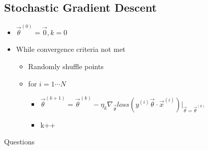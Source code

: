 \documentclass[10pt, oneside]{article}
\begin{document}
\subsection{Stochastic Gradient Descent}
\begin{itemize}
    \item $\vec \theta^{(0)} = \vec 0, k=0$
    \item While convergence criteria not met
    \begin{itemize}
        \item Randomly shuffle points
        \item for $i=1\cdots N$
        \begin{itemize}
            \item $\vec \theta^{(k+1)} = \vec \theta ^{(k)} - \eta_k \nabla_{\vec \theta} loss(y^{(i)} \vec \theta \cdot \vec x^{(i)})|_{\vec \theta = \vec \theta^{(k)}}$
            \item k++
        \end{itemize}
    \end{itemize}
\end{itemize}
Questions
\end{document}

